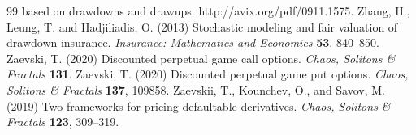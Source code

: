 \documentclass[10pt,a4paper]{amsart}
\begin{document}
\begin{thebibliography}{99}
			based on drawdowns and drawups. http://avix.org/pdf/0911.1575.
 Zhang, H., Leung, T. and Hadjiliadis, O. (2013) Stochastic modeling and fair valuation of drawdown insurance. {\it Insurance: Mathematics and Economics} {\bf 53}, 840--850.
 Zaevski, T. (2020) Discounted perpetual game call options. {\it Chaos, Solitons \& Fractals} {\bf 131}.
 Zaevski, T. (2020) Discounted perpetual game put options. {\it Chaos, Solitons \& Fractals} {\bf 137}, 109858.
 Zaevskii, T., Kounchev, O., and Savov, M. (2019)
			Two frameworks for pricing defaultable derivatives.
			{\it Chaos, Solitons \& Fractals} {\bf 123}, 309--319.
\end{thebibliography}
\end{document}
